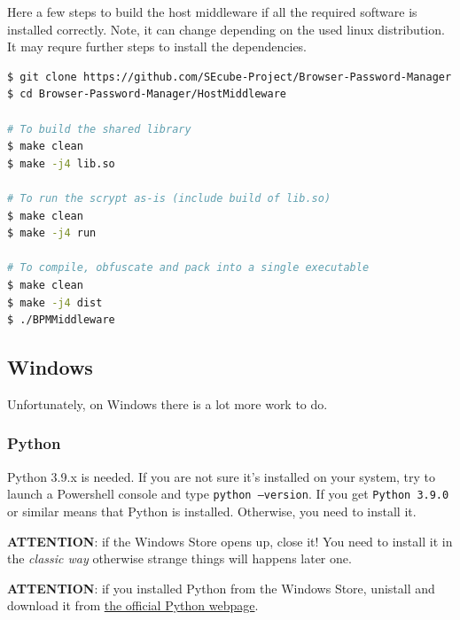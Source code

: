 Here a few steps to build the host middleware if all the required software is installed correctly. Note, it can change depending on the used linux distribution. It may requre further steps to install the dependencies.

\begin{lstlisting}[language=bash,caption={bash version}]
$ git clone https://github.com/SEcube-Project/Browser-Password-Manager.git
$ cd Browser-Password-Manager/HostMiddleware

# To build the shared library
$ make clean
$ make -j4 lib.so

# To run the scrypt as-is (include build of lib.so)
$ make clean
$ make -j4 run

# To compile, obfuscate and pack into a single executable
$ make clean
$ make -j4 dist
$ ./BPMMiddleware

\end{lstlisting}


\subsection{Windows}
Unfortunately, on Windows there is a lot more work to do.

\subsubsection{Python}
Python 3.9.x is needed. If you are not sure it's installed on your system, try to launch a Powershell console and type \texttt{python --version}. If you get \texttt{Python 3.9.0} or similar means that Python is installed. Otherwise, you need to install it. \\

\begin{warning}
\textbf{ATTENTION}: if the Windows Store opens up, close it! You need to install it in the \textit{classic way} otherwise strange things will happens later one. 
\end{warning}

\begin{warning}
\textbf{ATTENTION}: if you installed Python from the Windows Store, unistall and download it from \href{https://www.python.org/downloads/release/python-390/}{the official Python webpage}.
\end{warning}

